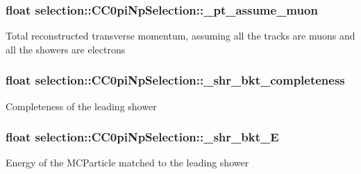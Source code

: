 \subsubsection[{\texorpdfstring{\+\_\+pt\+\_\+assume\+\_\+muon}{_pt_assume_muon}}]{\setlength{\rightskip}{0pt plus 5cm}float selection\+::\+C\+C0pi\+Np\+Selection\+::\+\_\+pt\+\_\+assume\+\_\+muon\hspace{0.3cm}{\ttfamily [private]}}\hypertarget{classselection_1_1CC0piNpSelection_a4213e006ba267c2ff55415cc9ef07bf8}{}\label{classselection_1_1CC0piNpSelection_a4213e006ba267c2ff55415cc9ef07bf8}
Total reconstructed transverse momentum, assuming all the tracks are muons and all the showers are electrons 
\subsubsection[{\texorpdfstring{\+\_\+shr\+\_\+bkt\+\_\+completeness}{_shr_bkt_completeness}}]{\setlength{\rightskip}{0pt plus 5cm}float selection\+::\+C\+C0pi\+Np\+Selection\+::\+\_\+shr\+\_\+bkt\+\_\+completeness\hspace{0.3cm}{\ttfamily [private]}}\hypertarget{classselection_1_1CC0piNpSelection_ac3c3c9895ca501c3b73f14addfddf495}{}\label{classselection_1_1CC0piNpSelection_ac3c3c9895ca501c3b73f14addfddf495}
Completeness of the leading shower 
\subsubsection[{\texorpdfstring{\+\_\+shr\+\_\+bkt\+\_\+E}{_shr_bkt_E}}]{\setlength{\rightskip}{0pt plus 5cm}float selection\+::\+C\+C0pi\+Np\+Selection\+::\+\_\+shr\+\_\+bkt\+\_\+E\hspace{0.3cm}{\ttfamily [private]}}\hypertarget{classselection_1_1CC0piNpSelection_aa1a21f48d99a4de5f1d444aa3d64dedf}{}\label{classselection_1_1CC0piNpSelection_aa1a21f48d99a4de5f1d444aa3d64dedf}
Energy of the M\+C\+Particle matched to the leading shower 
